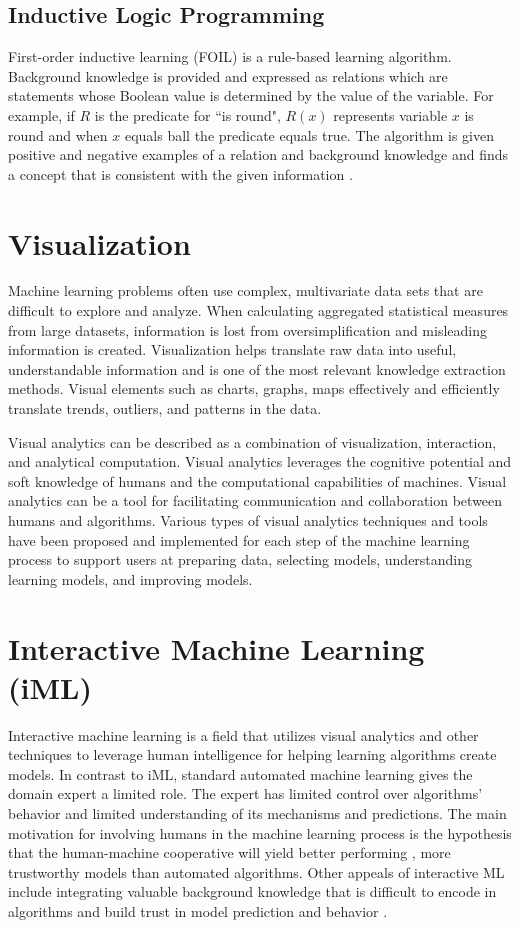 \subsection{ Inductive Logic Programming }
First-order inductive learning (FOIL) is a rule-based learning algorithm. Background knowledge is provided and expressed as relations which are statements whose Boolean value is determined by the value of the variable. For example, if $R$ is the predicate for ``is round", $R(x)$ represents variable $x$ is round and when $x$ equals ball the predicate equals true. The algorithm is given positive and negative examples of a relation and background knowledge and finds a concept that is consistent with the given information \cite{FOIL}. 
 

\section{Visualization}
\indent Machine learning problems often use complex, multivariate data sets that are difficult to explore and analyze. When calculating aggregated statistical measures from large datasets, information is lost from oversimplification and misleading information is created. Visualization helps translate raw data into useful, understandable information and is one of the most relevant knowledge extraction methods. Visual elements such as charts, graphs, maps effectively and efficiently translate trends, outliers, and patterns in the data.

Visual analytics can be described as a combination of visualization, interaction, and analytical computation. Visual analytics leverages the cognitive potential and soft knowledge of humans and the computational capabilities of machines. Visual analytics can be a tool for facilitating communication and collaboration between humans and algorithms. Various types of visual analytics techniques and tools have been proposed and implemented for each step of the machine learning process to support users at preparing data, selecting models, understanding learning models, and improving models. 

\section{Interactive Machine Learning (iML)}
Interactive machine learning is a field that utilizes visual analytics and other techniques to leverage human intelligence for helping learning algorithms create models. In contrast to iML, standard automated machine learning gives the domain expert a limited role. The expert has limited control over algorithms' behavior and limited understanding of its mechanisms and predictions. The main motivation for involving humans in the machine learning process is the hypothesis that the human-machine cooperative will yield better performing \cite{InteractiveML}, more trustworthy models than automated algorithms. Other appeals of interactive ML include integrating valuable background knowledge that is difficult to encode in algorithms and build trust in model prediction and behavior \cite{InteractiveML}. 


